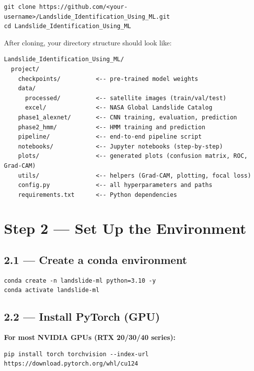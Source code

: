 \documentclass[11pt]{article}
\begin{document}
\begin{verbatim}
git clone https://github.com/<your-username>/Landslide_Identification_Using_ML.git
cd Landslide_Identification_Using_ML
\end{verbatim}

\noindent After cloning, your directory structure should look like:

\begin{verbatim}
Landslide_Identification_Using_ML/
  project/
    checkpoints/          <-- pre-trained model weights
    data/
      processed/          <-- satellite images (train/val/test)
      excel/              <-- NASA Global Landslide Catalog
    phase1_alexnet/       <-- CNN training, evaluation, prediction
    phase2_hmm/           <-- HMM training and prediction
    pipeline/             <-- end-to-end pipeline script
    notebooks/            <-- Jupyter notebooks (step-by-step)
    plots/                <-- generated plots (confusion matrix, ROC, Grad-CAM)
    utils/                <-- helpers (Grad-CAM, plotting, focal loss)
    config.py             <-- all hyperparameters and paths
    requirements.txt      <-- Python dependencies
\end{verbatim}

\section{Step 2 --- Set Up the Environment}

\subsection{2.1 --- Create a conda environment}

\begin{verbatim}
conda create -n landslide-ml python=3.10 -y
conda activate landslide-ml
\end{verbatim}

\subsection{2.2 --- Install PyTorch (GPU)}

\textbf{For most NVIDIA GPUs (RTX 20/30/40 series):}
\begin{verbatim}
pip install torch torchvision --index-url https://download.pytorch.org/whl/cu124
\end{verbatim}
\end{document}

